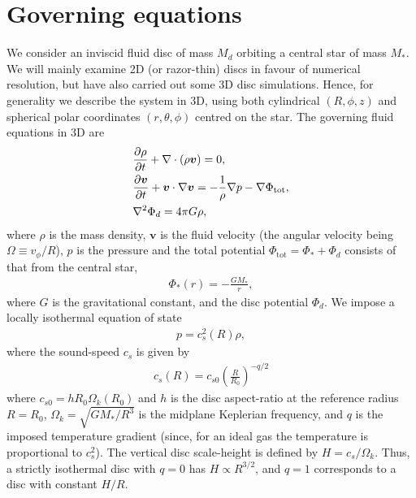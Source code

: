 \section{Governing equations}\label{model} 
We consider an inviscid fluid disc of mass $M_d$ 
orbiting a central star of mass $M_*$. We will mainly examine 2D
(or razor-thin) discs in favour of numerical 
resolution, but have also carried out some 3D disc
simulations. Hence, for generality we describe the system in
3D, using both cylindrical $(R,\phi,z)$ and spherical polar
coordinates $(r,\theta,\phi)$ centred on the star. 
The governing fluid equations in 3D are  
\begin{align}
  &\frac{\partial\rho}{\partial t} + \nabla\cdot\left(\rho\bm{v}\right) =
  0,\label{cont_eq}\\
  &\frac{\partial\bm{v}}{\partial t} + \bm{v}\cdot\nabla\bm{v} = -\frac{1}{\rho}\nabla
  p -\nabla \Phi_\mathrm{tot}\label{mom_eq},\\ 
  & \nabla^2\Phi_d = 4 \pi G \rho \label{poisson}, 
\end{align}
where $\rho$ is the mass density, $\bm{v}$ is the 
fluid velocity (the angular velocity being $\Omega \equiv v_\phi/R$), 
$p$ is the pressure and the total potential
$\Phi_\mathrm{tot} = \Phi_* + \Phi_d$ consists of that from the
central star, 
\begin{align}
  \Phi_*(r) = -\frac{GM_*}{r}, 
\end{align}
where $G$ is the gravitational constant,  and the disc potential
$\Phi_d$. We impose a locally isothermal equation of state 
\begin{align}
  p = c_s^2(R)\rho,
\end{align}
where the sound-speed $c_s$ is given by 
\begin{align}\label{sound-speed}
  c_s(R) = c_{s0}\left(\frac{R}{R_0}\right)^{-q/2}
\end{align}
where $c_{s0} = h R_0\Omega_k(R_0)$ and 
$h$ is the disc aspect-ratio at the reference radius $R=R_0$, 
$\Omega_k=\sqrt{GM_*/R^3}$ is the midplane Keplerian frequency, and
$q$ is the imposed temperature gradient (since, for an ideal gas the
temperature is proportional to $c_s^2$). The vertical disc scale-height is
defined by $H=c_s/\Omega_k$. Thus, a strictly isothermal disc with
$q=0$ has $H\propto R^{3/2}$, and $q=1$ corresponds to a 
 disc with constant $H/R$. 





